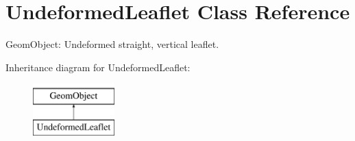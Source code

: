 \hypertarget{classUndeformedLeaflet}{}\section{Undeformed\+Leaflet Class Reference}
\label{classUndeformedLeaflet}


Geom\+Object\+: Undeformed straight, vertical leaflet.  


Inheritance diagram for Undeformed\+Leaflet\+:\begin{figure}[H]
\begin{center}
\leavevmode
\includegraphics[height=2.000000cm]{classUndeformedLeaflet}
\end{center}
\end{figure}
